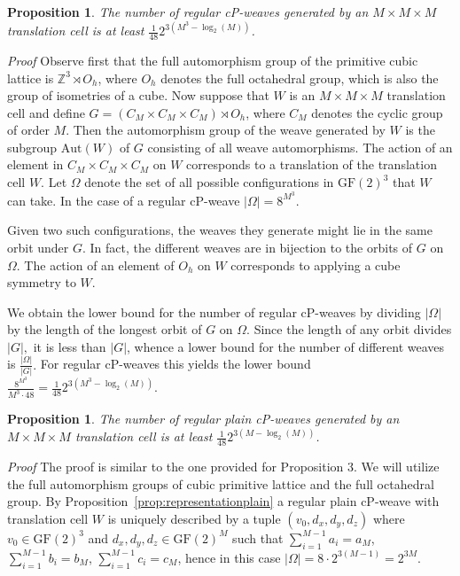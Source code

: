 \documentclass[unnumsec,webpdf,contemporary,large]{oup-authoring-template}%
\theoremstyle{thmstyleone}%
\newtheorem{proposition}[theorem]{Proposition}%
\theoremstyle{thmstyletwo}%
\theoremstyle{thmstylethree}%
\newcommand{\GF}{{\mathrm{GF}}}
\newcommand{\Z}{{\mathbb{Z}}}
\newcommand{\ergun}[1]{{\color{black} #1}}
\begin{document}
\begin{proposition}\label{prop:numbercubic}
The number of regular cP-weaves generated by
an $M\times M \times M$ translation cell is at least  $\frac{1}{48}2^{3(M^3-\log_2(M))}$.
\end{proposition}

\noindent\textit{Proof}
Observe first that the full automorphism group of the primitive cubic lattice is $\Z^3 \rtimes O_h$, where $O_h$ denotes the full octahedral group, which is also the group of isometries of a cube. Now suppose that $W$ is an $M\times M\times M$ translation cell and define $G=(C_M \times C_M \times C_M)\rtimes O_h $,
where $C_M$ denotes the cyclic group of order $M$.
Then the automorphism group of the weave generated by $W$ is the subgroup $\textrm{Aut}(W)$ of $G$ consisting of all weave automorphisms.
 The action of an element in $C_M\times C_M\times C_M$ on
$W$ corresponds to a translation of the translation cell $W$.
Let $\Omega$ denote the set of all possible configurations in $\GF(2)^3$ that $W$  can take. In the case of a regular cP-weave $|\Omega|=8^{M^3}$.

Given two such configurations, the weaves they generate
might lie in the same orbit under $G$.  In fact,  
the different weaves are in bijection to the orbits of $G$ on $\Omega$.
The action of an element of $O_h$ on $W$ corresponds to applying a
cube symmetry to $W$.

We obtain the lower bound for the number of regular  cP-weaves
by dividing $|\Omega|$ by the length of the longest orbit of $G$ on $\Omega$. Since the length of any orbit divides $|G|,$ it is less than $ |G|$, whence a lower bound for the number of different weaves is
$ \frac{|\Omega|}{|G|}.$
For regular cP-weaves this yields the lower bound
$ \frac{8^{M^3}}{M^3\cdot 48} = \frac{1}{48}2^{3(M^3-\log_2(M))}$.

\ergun{
\begin{proposition}\label{prop:numbercubicplain}
The number of regular plain cP-weaves generated by
an $M\times M \times M$ translation cell is at least $\frac{1}{48}2^{3(M-\log_2(M))}$.
\end{proposition}

\noindent\textit{Proof}
The proof is similar to the one provided for Proposition 3. We will utilize the full automorphism groups of cubic primitive lattice and the full octahedral group.
By Proposition~\ref{prop:representationplain} a regular plain cP-weave with translation cell $W$  is uniquely described
by a tuple $(v_0, d_x, d_y, d_z)$ where $v_0\in \GF(2)^3$ and
$d_x, d_y, d_z\in \GF(2)^M$ such that 
$\sum_{i=1}^{M-1} a_i = a_M$, 
$\sum_{i=1}^{M-1} b_i = b_M$, 
$\sum_{i=1}^{M-1} c_i = c_M$,
hence in this case $|\Omega| = 8 \cdot 2^{3(M-1)} = 2^{3M}. $
}
\end{document}
